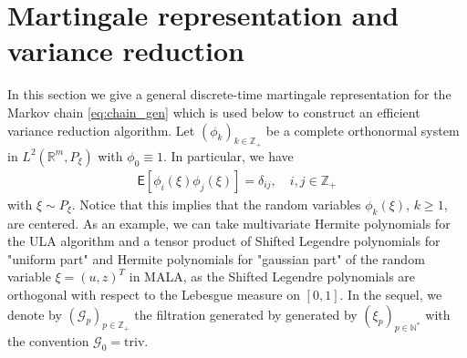 \documentclass[bj]{imsart}
\begin{document}
\section{Martingale representation and variance reduction}
\label{seq:mart_repr}
In this section we give a general discrete-time martingale representation for the Markov chain \eqref{eq:chain_gen} which is  used below to construct an efficient variance reduction algorithm. Let \((\phi_k)_{k\in \mathbb{Z}_+}\) be a complete orthonormal system in \(L^2(\mathbb{R}^m, P_{\xi})\) with \(\phi_0\equiv 1\).  In particular, we have
\begin{eqnarray*}
\mathsf{E}[\phi_i(\xi)\phi_j(\xi)]=\delta_{ij},\quad i,j\in  \mathbb{Z}_{+}
\end{eqnarray*}
with \(\xi \sim P_{\xi}.\)
Notice that this implies that the random variables
$\phi_k(\xi)$, $k\ge1$, are centered. As an example, we can take  multivariate Hermite polynomials for the ULA algorithm and a tensor product of Shifted Legendre polynomials for "uniform part" and Hermite polynomials for "gaussian part"  of the random variable $\xi = (u, z)^T$ in MALA, as the Shifted Legendre polynomials are orthogonal with respect to the Lebesgue measure on \([0,1].\) In the sequel, we denote by $(\mathcal{G}_p)_{p\in \mathbb{Z}_+}$  the filtration
generated by generated by $(\xi_p)_{p \in \mathbb{N}^*}$ with the convention $\mathcal{G}_0=\mathrm{triv}$.
\end{document}
